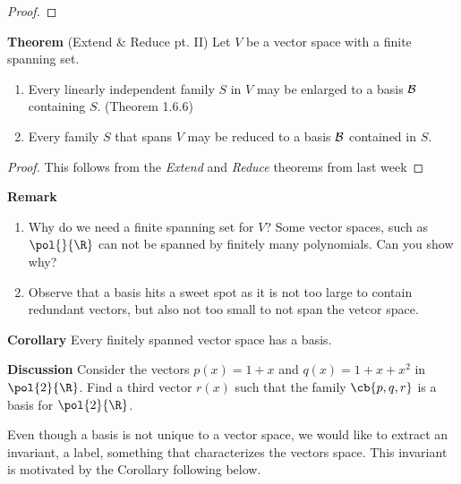 \documentclass[letterpaper, 10pt]{article}
\begin{document}
\begin{proof}
\end{proof}




\vspace{100pt}
\lb
\textbf{Theorem}  (Extend \& Reduce pt. II)
\lb
Let $V$ be a vector space with a finite spanning set.
\begin{enumerate}
    \item 
        Every linearly independent family $S$ in $V$ may be enlarged to
        a basis $\cal B$ containing $S$. (Theorem 1.6.6)
    \item
        Every family $S$ that spans $V$ may be reduced to a basis $\cal B$ contained in $S$.
\end{enumerate}

\begin{proof}
This follows from the \emph{Extend} and \emph{Reduce} theorems from last week
\end{proof}




\newpage
\lb
\textbf{Remark}
\begin{enumerate}
    \item 
        Why do we need a finite spanning set for $V$? Some vector spaces, such as
        $\pol{}{\R}$ can not be spanned by finitely many polynomials.
        Can you show why?
    \item
        Observe that a basis hits a sweet spot as it is not too
        large to contain redundant vectors, but also not too
        small to not span the vetcor space.
\end{enumerate}






\lb
\textbf{Corollary}
\lb
Every finitely spanned vector space has a basis.





\lb
\textbf{Discussion}
\lb
Consider the vectors $p(x) = 1 + x$ and $q(x) = 1 + x + x^2$ in $\pol{2}{\R}$.
Find a third vector $r(x)$ such that the family $\cb{p, q, r}$ is a basis for $\pol{2}{\R}$.







\newpage
\lb
Even though a basis is not unique to a vector space, we would like to extract
an invariant, a label, something that characterizes the vectors space.
This invariant is motivated by the Corollary following below.
\end{document}
